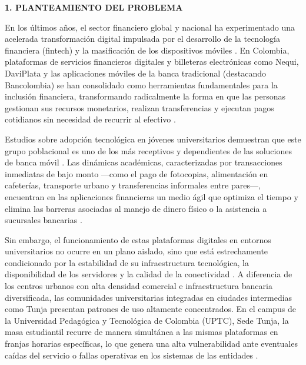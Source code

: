 \hypertarget{sec:planteamiento}{}%
\begin{center}
    {\Large\bfseries 1. PLANTEAMIENTO DEL PROBLEMA}
\end{center}
\vspace{1em}

\hypertarget{sec:antecedentes}{}%
\par\vspace{0.5em}

En los últimos años, el sector financiero global y nacional ha experimentado una acelerada transformación digital impulsada por el desarrollo de la tecnología financiera (fintech) y la masificación de los dispositivos móviles \cite{bermeo2022transformacion}. En Colombia, plataformas de servicios financieros digitales y billeteras electrónicas como Nequi, DaviPlata y las aplicaciones móviles de la banca tradicional (destacando Bancolombia) se han consolidado como herramientas fundamentales para la inclusión financiera, transformando radicalmente la forma en que las personas gestionan sus recursos monetarios, realizan transferencias y ejecutan pagos cotidianos sin necesidad de recurrir al efectivo \cite{banca2024reporte}.

Estudios sobre adopción tecnológica en jóvenes universitarios demuestran que este grupo poblacional es uno de los más receptivos y dependientes de las soluciones de banca móvil \cite{lopez2023adopcion}. Las dinámicas académicas, caracterizadas por transacciones inmediatas de bajo monto —como el pago de fotocopias, alimentación en cafeterías, transporte urbano y transferencias informales entre pares—, encuentran en las aplicaciones financieras un medio ágil que optimiza el tiempo y elimina las barreras asociadas al manejo de dinero físico o la asistencia a sucursales bancarias \cite{restrepo2023habitos}.

Sin embargo, el funcionamiento de estas plataformas digitales en entornos universitarios no ocurre en un plano aislado, sino que está estrechamente condicionado por la estabilidad de su infraestructura tecnológica, la disponibilidad de los servidores y la calidad de la conectividad \cite{martinez2023retos}. A diferencia de los centros urbanos con alta densidad comercial e infraestructura bancaria diversificada, las comunidades universitarias integradas en ciudades intermedias como Tunja presentan patrones de uso altamente concentrados. En el campus de la Universidad Pedagógica y Tecnológica de Colombia (UPTC), Sede Tunja, la masa estudiantil recurre de manera simultánea a las mismas plataformas en franjas horarias específicas, lo que genera una alta vulnerabilidad ante eventuales caídas del servicio o fallas operativas en los sistemas de las entidades \cite{pulido2024caracteristicas}.

